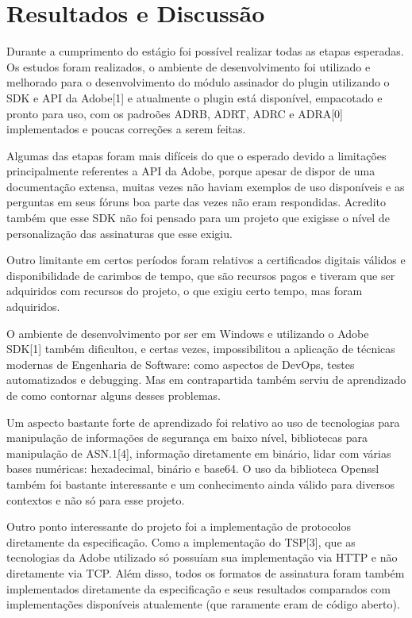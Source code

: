 \chapter[Resultados e Discussão]{Resultados e Discussão}


Durante a cumprimento do estágio foi possível realizar todas as etapas esperadas. Os estudos foram realizados, o ambiente de desenvolvimento foi
utilizado e melhorado para o desenvolvimento do módulo assinador do plugin utilizando o SDK e API da Adobe[1] e atualmente o plugin está disponível,
empacotado e pronto para uso, com os padroões ADRB, ADRT, ADRC e ADRA[0] implementados e poucas correções a serem feitas.

Algumas das etapas foram mais difíceis do que o esperado devido a limitações principalmente referentes a API da Adobe, porque apesar de dispor de uma
documentação extensa, muitas vezes não haviam exemplos de uso disponíveis e as perguntas em seus fóruns boa parte das vezes não eram respondidas.
Acredito também que esse SDK não foi pensado para um projeto que exigisse o nível de personalização das assinaturas que esse exigiu.

Outro limitante em certos períodos foram relativos a certificados digitais válidos e disponibilidade de carimbos de tempo, que são recursos pagos e
tiveram que ser adquiridos com recursos do projeto, o que exigiu certo tempo, mas foram adquiridos.

O ambiente de desenvolvimento por ser em Windows e utilizando o Adobe SDK[1] também dificultou, e certas vezes, impossibilitou a aplicação de técnicas modernas
de Engenharia de Software: como aspectos de DevOps, testes automatizados e debugging. Mas em contrapartida também serviu de aprendizado de como contornar
alguns desses problemas.

Um aspecto bastante forte de aprendizado foi relativo ao uso de tecnologias para manipulação de informações de segurança em baixo nível, bibliotecas
para manipulação de ASN.1[4], informação diretamente em binário, lidar com várias bases numéricas: hexadecimal, binário e base64. O uso da biblioteca
Openssl também foi bastante interessante e um conhecimento ainda válido para diversos contextos e não só para esse projeto.

Outro ponto interessante do projeto foi a implementação de protocolos diretamente da especificação. Como a implementação do TSP[3], que
as tecnologias da Adobe utilizado só possuíam sua implementação via HTTP e não diretamente via TCP. Além disso, todos os formatos de assinatura foram
também implementados diretamente da especificação e seus resultados comparados com implementações disponíveis atualemente (que raramente eram de código aberto).

